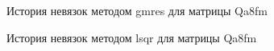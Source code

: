 \begin{figure}[H]
    \renewcommand{\figurename}{Рисунок}
    \caption{История невязок методом gmres для матрицы Qa8fm}
    \label{fig:image_16}
\end{figure}

\begin{figure}[H]
    \renewcommand{\figurename}{Рисунок}
    \caption{История невязок методом lsqr для матрицы Qa8fm}
    \label{fig:image_17}
\end{figure}

